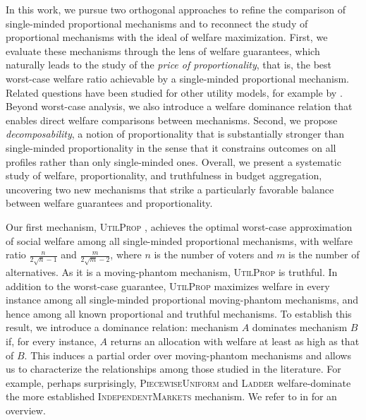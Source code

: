 \documentclass[11pt]{article}
\newcommand{\IM}{\textsc{IndependentMarkets} }
\newcommand{\Ladder}{\textsc{Ladder} }
\newcommand{\PiecewiseUniform}{\textsc{PiecewiseUniform} }
\newcommand{\UtP}{\textsc{UtilProp} }
\begin{document}
In this work, we pursue two orthogonal approaches to refine the comparison of single-minded proportional mechanisms and to reconnect the study of proportional mechanisms with the ideal of welfare maximization. First, we evaluate these mechanisms through the lens of welfare guarantees, which naturally leads to the study of the \emph{price of proportionality}, that is, the best worst-case welfare ratio achievable by a single-minded proportional mechanism. Related questions have been studied for other utility models, for example by \citet{MPS20a}. Beyond worst-case analysis, we also introduce a welfare dominance relation that enables direct welfare comparisons between mechanisms.
Second, we propose \emph{decomposability}, a notion of proportionality that is substantially stronger than single-minded proportionality in the sense that it constrains outcomes on all profiles rather than only single-minded ones. Overall, we present a systematic study of welfare, proportionality, and truthfulness in budget aggregation, uncovering two new mechanisms that strike a particularly favorable balance between welfare guarantees and proportionality. %


Our first mechanism, \UtP, achieves the optimal worst-case approximation of social welfare among all single-minded proportional mechanisms, with welfare ratio $\textstyle \frac{n}{2\sqrt{n}-1}$ and $\textstyle \frac{m}{2\sqrt{m}-2}$, where $n$ is the number of voters and $m$ is the number of alternatives. As it is a moving-phantom mechanism, \UtP is truthful. In addition to the worst-case guarantee, \UtP maximizes welfare in every instance among all single-minded proportional moving-phantom mechanisms, and hence among all known proportional and truthful mechanisms.
To establish this result, we introduce a dominance relation: mechanism $A$ dominates mechanism $B$ if, for every instance, $A$ returns an allocation with welfare at least as high as that of $B$. This induces a partial order over moving-phantom mechanisms and allows us to characterize the relationships among those studied in the literature. For example, perhaps surprisingly, \PiecewiseUniform \cite{caragiannis2022truthful} and \Ladder \cite{freeman2024project} welfare-dominate the more established \IM mechanism. We refer to  in  for an overview.
\end{document}
